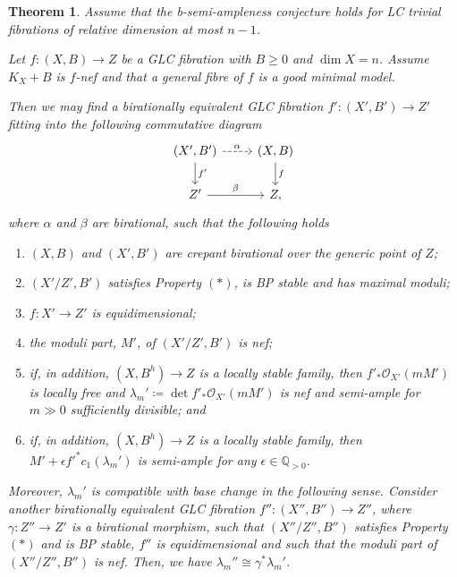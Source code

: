 \documentclass[12pt]{amsart}
\theoremstyle{plain}
\newtheorem{theorem}{Theorem}[section]
\theoremstyle{definition}
\def\dim{\operatorname{dim}}
\def\det{\operatorname{det}}
\newcommand{\margg}[1]{\normalsize{{\color{red}\footnote{{\color{red}#1}}}{\marginpar[{\color{red}\hfill\tiny\thefootnote$\rightarrow$}]{{\color{red}$\leftarrow$\tiny\thefootnote}}}}}
\newcommand{\Ste}[1]{\margg{(Ste) #1}}
\def\K#1.{K_{#1}}
\def \QP {\mathbb Q_{>0}}
\begin{document}
\begin{theorem} \label{main_thm_techincal}
\label{thm_*}
Assume that the 
b-semi-ampleness conjecture holds for LC trivial fibrations of relative dimension at most $n-1$.

Let $f\colon (X, B) \rightarrow Z$ be a GLC fibration with $B \geq 0$ and $\dim X= n$.
Assume $\K X. + B$ is $f$-nef and 
that a general fibre of $f$ is a good minimal model.

Then we may find a birationally equivalent GLC fibration 
$f'\colon (X', B') \rightarrow Z'$
fitting into the following commutative diagram
\[
\begin{tikzcd}
  (X', B') \arrow[r, "\alpha", dashrightarrow] \arrow[d, "f'"] & (X, B) \arrow[d, "f"] \\
  Z' \arrow[r, "\beta"] &  Z,
 \end{tikzcd}
\]
where $\alpha$ and $\beta$ are birational,
such that the following holds
\begin{enumerate}
\item $(X, B)$ and $(X', B')$ are crepant birational over the generic point of $Z$;

\item $(X'/Z', B')$ satisfies Property $(*)$, is BP stable and has maximal moduli;

\item $f\colon X' \rightarrow Z'$ is equidimensional;

\item the moduli part, $M'$, of $(X'/Z', B')$ is nef;

\item if, in addition, $(X, B^h) \to Z$ is a locally stable family, then $f'_*\mathcal O_{X'}(mM')$ is locally free and 
$\lambda_m'\coloneqq \det f'_*\mathcal O_{X'}(mM')$ is nef and semi-ample for $m \gg 0$ sufficiently divisible; and

\item if, in addition, $(X, B^h) \to Z$ is a locally stable family, then $M'+\epsilon f'^*c_1(\lambda_m')$ is semi-ample for any $\epsilon \in \QP$.
\end{enumerate}

Moreover, $\lambda_m'$ is compatible with base change in the following sense.
Consider another birationally equivalent GLC fibration $f''\colon (X'', B'') \rightarrow Z''$, 
where $\gamma\colon Z'' \rightarrow Z'$ is a birational morphism, such that $(X''/Z'', B'')$ satisfies Property $(*)$ and is BP stable,
$f''$ is equidimensional and such that the moduli part of $(X''/Z'', B'')$ is nef.
Then, we have $\lambda_m'' \cong \gamma^*\lambda_m'$.  
\end{theorem}
\end{document}
